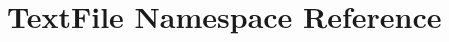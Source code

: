 \hypertarget{namespaceTextFile}{\section{Text\-File Namespace Reference}
\label{namespaceTextFile}
}

